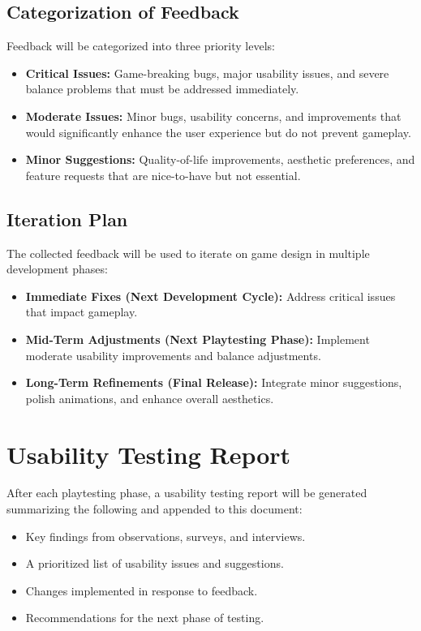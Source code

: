 \documentclass[12pt, titlepage]{article}
\begin{document}
\subsection{Categorization of Feedback}
Feedback will be categorized into three priority levels:
\begin{itemize}
    \item \textbf{Critical Issues:} Game-breaking bugs, major usability issues, and severe balance problems that must be addressed immediately.
    \item \textbf{Moderate Issues:} Minor bugs, usability concerns, and improvements that would significantly enhance the user experience but do not prevent gameplay.
    \item \textbf{Minor Suggestions:} Quality-of-life improvements, aesthetic preferences, and feature requests that are nice-to-have but not essential.
\end{itemize}

\subsection{Iteration Plan}
The collected feedback will be used to iterate on game design in multiple development phases:
\begin{itemize}
    \item \textbf{Immediate Fixes (Next Development Cycle):} Address critical issues that impact gameplay.
    \item \textbf{Mid-Term Adjustments (Next Playtesting Phase):} Implement moderate usability improvements and balance adjustments.
    \item \textbf{Long-Term Refinements (Final Release):} Integrate minor suggestions, polish animations, and enhance overall aesthetics.
\end{itemize}

\newpage

\section{Usability Testing Report}
After each playtesting phase, a usability testing report will be generated summarizing the following and appended to this document:
\begin{itemize}
    \item Key findings from observations, surveys, and interviews.
    \item A prioritized list of usability issues and suggestions.
    \item Changes implemented in response to feedback.
    \item Recommendations for the next phase of testing.
\end{itemize}
\end{document}
